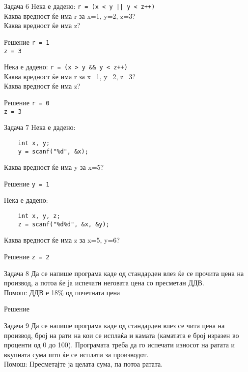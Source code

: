 \begin{frame}[fragile]{Задача 6}
Нека е дадено: \texttt{r = (x < y || y < z++)}\\
	Каква вредност ќе има r за x=1, y=2, z=3?\\
	Каква вредност ќе има z?
	\begin{exampleblock}{Решение}
	\texttt{r = 1\\z = 3}
	\end{exampleblock}
Нека е дадено: \texttt{r = (x > y \&\& y < z++)}\\
	Каква вредност ќе има r за x=1, y=2, z=3?\\
	Каква вредност ќе има z?
	\begin{exampleblock}{Решение}
	\texttt{r = 0\\z = 3}
	\end{exampleblock}
\end{frame}

\begin{frame}[fragile]{Задача 7}
Нека е дадено:
\begin{lstlisting}
	int x, y;
	y = scanf("%d", &x);
\end{lstlisting}
Каква вредност ќе има y за x=5?
	\begin{exampleblock}{Решение}
	\texttt{y = 1}
	\end{exampleblock}
Нека е дадено:
\begin{lstlisting}
	int x, y, z;
	z = scanf("%d%d", &x, &y);
\end{lstlisting}
	Каква вредност ќе има z за x=5, y=6?
	\begin{exampleblock}{Решение}
	\texttt{z = 2}
	\end{exampleblock}
\end{frame}


\begin{frame}[fragile]{Задача 8}
Да се напише програма каде од стандарден влез ќе се прочита цена на производ, а
потоа ќе ја испечати неговата цена со пресметан ДДВ.\\ Помош: ДДВ е 18\% од почетната цена
	\begin{exampleblock}{Решение}
		
	\end{exampleblock}
\end{frame}


\begin{frame}[fragile]{Задача 9}
Да се напише програма каде од стандарден влез се чита цена на производ, број на
рати на кои се исплаќа и камата (каматата е број изразен во проценти од 0 до 100). 
Програмата треба да го испечати износот на ратата и вкупната сума што ќе се исплати за производот.\\
Помош: Пресметајте ја целата сума, па потоа ратата.
\end{frame}

